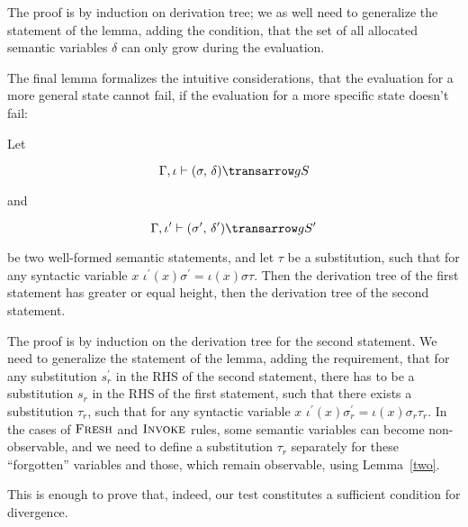 The proof is by induction on derivation tree; we as well need to generalize the statement of the lemma, adding the condition, that the 
set of all allocated semantic variables $\delta$ can only grow during the evaluation.

The final lemma formalizes the intuitive considerations, that the evaluation for a more general state cannot fail, if the evaluation 
for a more specific state doesn't fail:

\begin{lemma}
\label{three}
\normalfont
Let 

$$
\otrans{\Gamma,\iota}{(\sigma,\,\delta)}{g}{S}
$$ 

and 

$$\otrans{\Gamma,\iota^\prime}{(\sigma^\prime,\,\delta^\prime)}{g}{S^\prime}
$$

\noindent be two well-formed semantic statements, and let $\tau$ be a substitution, such that 
for any syntactic variable $x$ \mbox{$\iota^\prime(x) \sigma^\prime = \iota(x) \sigma \tau$}. Then the 
derivation tree of the first statement has greater or equal height, then the derivation 
tree of the second statement.
\end{lemma}

The proof is by induction on the derivation tree for the second statement. We need to generalize the statement of the lemma, adding the requirement, that 
for any substitution $s^\prime_r$ in the RHS of the second statement, there has to be a substitution $s_r$ in the RHS of the first statement,
such that there exists a substitution $\tau_r$, such that for any syntactic variable $x$ \mbox{$\iota^\prime(x) \sigma^\prime_r = \iota(x) \sigma_r \tau_r$}. 
In the cases of $\textsc{Fresh}$ and $\textsc{Invoke}$ rules, some semantic variables can become non-observable, and we need to define a substitution $\tau_r$ 
separately for these ``forgotten'' variables and those, which remain observable, using Lemma~\ref{two}.

This is enough to prove that, indeed, our test constitutes a sufficient condition for divergence.

